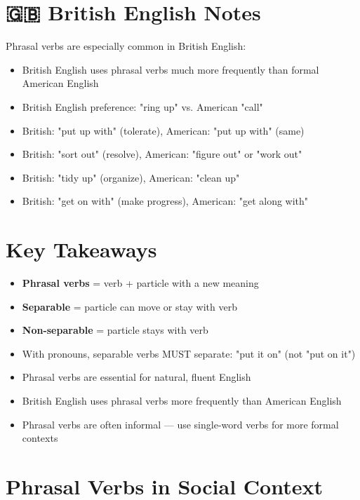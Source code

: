 \section{🇬🇧 British English Notes}

Phrasal verbs are especially common in British English:

\begin{itemize}
    \item British English uses phrasal verbs much more frequently than formal American English
    \item British English preference: "ring up" vs. American "call"
    \item British: "put up with" (tolerate), American: "put up with" (same)
    \item British: "sort out" (resolve), American: "figure out" or "work out"
    \item British: "tidy up" (organize), American: "clean up"
    \item British: "get on with" (make progress), American: "get along with"
\end{itemize}

\section{Key Takeaways}

\begin{itemize}
    \item \textbf{Phrasal verbs} = verb + particle with a new meaning
    \item \textbf{Separable} = particle can move or stay with verb
    \item \textbf{Non-separable} = particle stays with verb
    \item With pronouns, separable verbs MUST separate: "put it on" (not "put on it")
    \item Phrasal verbs are essential for natural, fluent English
    \item British English uses phrasal verbs more frequently than American English
    \item Phrasal verbs are often informal — use single-word verbs for more formal contexts
\end{itemize}

\section{Phrasal Verbs in Social Context}


